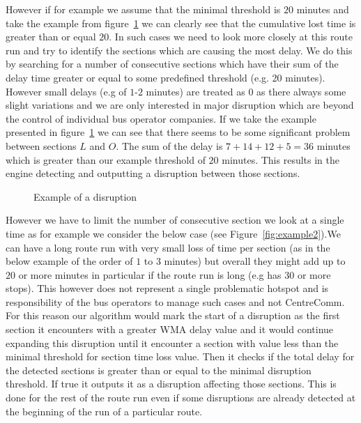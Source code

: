 However if for example we assume that the minimal threshold is $20$ minutes and take the example from figure~\ref{fig:example3} we can clearly see that the cumulative lost time is greater than or equal $20$. In such cases we need to look more closely at this route run and try to identify the sections which are causing the most delay. We do this by searching for a number of consecutive sections which have their sum of the delay time greater or equal to some predefined threshold (e.g. 20 minutes). However small delays (e.g of $1$-$2$ minutes) are treated as $0$ as there always some slight variations and we are only interested in major disruption which are beyond the control of individual bus operator companies. If we take the example presented in figure~\ref{fig:example3} we can see that there seems to be some significant problem between sections $L$ and $O$. The sum of the delay is $7+14+12+5 = 36$ minutes which is greater than our example threshold of $20$ minutes. This results in the engine detecting and outputting a disruption between those sections.

\begin{figure}[ht]
	\caption{Example of a disruption}
	\label{fig:example3}
\end{figure}

However we have to limit the number of consecutive section we look at a single time as for example we consider the below case (see Figure~\ref{fig:example2}).We can have a long route run with very small loss of time per section (as in the below example of the order of $1$ to $3$ minutes) but overall they might add up to $20$ or more minutes in particular if the route run is long (e.g has 30 or more stops). This however does not represent a single problematic hotspot and is responsibility of the bus operators to manage such cases and not CentreComm. For this reason our algorithm would mark the start of a disruption as the first section it encounters with a greater WMA delay value and it would continue expanding this disruption until it encounter a section with value less than the minimal threshold for section time loss value. Then it checks if the total delay for the detected sections is greater than or equal to the minimal disruption threshold. If true it outputs it as a disruption affecting those sections. This is done for the rest of the route run even if some disruptions are already detected at the beginning of the run of a particular route.

